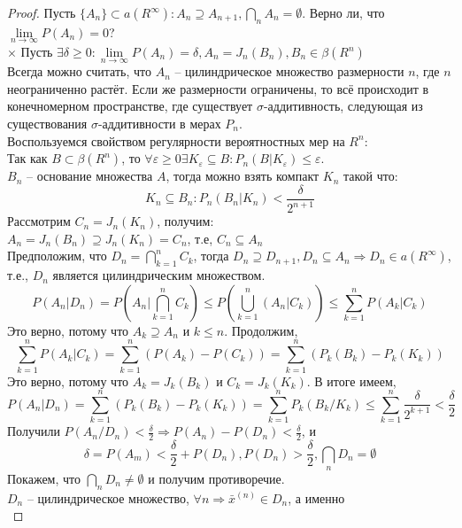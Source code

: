\begin{proof}
Пусть $\{A_n\}\subset a(R^\infty) : A_n \supseteq A_{n+1}, \bigcap\limits_n A_n = \emptyset$. Верно ли, что $\lim\limits_{n\rightarrow\infty}P(A_n)=0$?\\
\textcircled{$\times$} %
Пусть $\exists \delta \geq 0: \lim\limits_{n\rightarrow\infty}P(A_n)=\delta, A_n=J_n(B_n), B_n\in \beta (R^n)$\\
Всегда можно считать, что $A_n$ -- цилиндрическое множество размерности $n$, где $n$ неограниченно растёт. Если же размерности ограничены, то всё происходит в конечномерном пространстве, где существует $\sigma$-аддитивность, следующая из существования $\sigma$-аддитивности в мерах $P_n$.\\
Воспользуемся свойством регулярности вероятностных мер на $R^n$:\\
Так как $B\subset \beta (R^n)$, то $\forall \varepsilon \geq 0 \exists K_\varepsilon \subseteq B : P_n(B|K_\varepsilon) \leq \varepsilon$.\\
$B_n$ -- основание множества $A$, тогда можно взять компакт $K_n$ такой что:
$$K_n \subseteq B_n : P_n(B_n|K_n) < \frac{\delta}{2^{n+1}}$$
Рассмотрим $C_n=J_n(K_n)$, получим:\\
$A_n = J_n(B_n)\supseteq J_n (K_n) = C_n$, т.е, $C_n \subseteq A_n$\\
Предположим, что $D_n = \bigcap\limits_{k=1}^n C_k$, тогда $D_n \supseteq D_{n+1}, D_n \subseteq A_n \Rightarrow D_n \in a(R^\infty)$, т.е., $D_n$ является цилиндрическим множеством.
$$P(A_n|D_n) = P\left(A_n|\bigcap\limits_{k=1}^n C_k\right) \leqslant P\left(\bigcup\limits_{k=1}^n (A_n|C_k)\right) \leqslant \sum\limits_{k=1}^n P(A_k | C_k)$$
Это верно, потому что $A_k\supseteq A_n$ и $k\leqslant n$. Продолжим,
$$\sum\limits_{k=1}^n P(A_k | C_k)=\sum\limits_{k=1}^n \left(P(A_k)-P(C_k)\right)=\sum\limits_{k=1}^n \left(P_k(B_k)-P_k(K_k)\right)$$
Это верно, потому что $A_k = J_k(B_k)$ и $C_k= J_k(K_k)$. В итоге имеем,
$$P(A_n|D_n) = \sum\limits_{k=1}^n \left(P_k(B_k)-P_k(K_k)\right) = \sum\limits_{k=1}^n P_k \left(B_k/ K_k\right)\leqslant \sum\limits_{k=1}^n \frac{\delta}{2^{k+1}} < \frac{\delta}{2}$$
Получили $P(A_n/D_n) < \frac{\delta}{2} \Rightarrow P(A_n)-P(D_n) < \frac{\delta}{2}$, и
$$\delta = P(A_m) < \frac{\delta}{2}+P(D_n), P(D_n) > \frac{\delta}{2}, \bigcap\limits_n D_n = \emptyset$$
Покажем, что $\bigcap\limits_n D_n \ne \emptyset$ и получим противоречие.\\
$D_n$ -- цилиндрическое множество, $\forall n \Rightarrow \bar{x}^{(n)}\in D_n$, а именно
\begin{displaymath}

\end{displaymath}
\end{proof}
